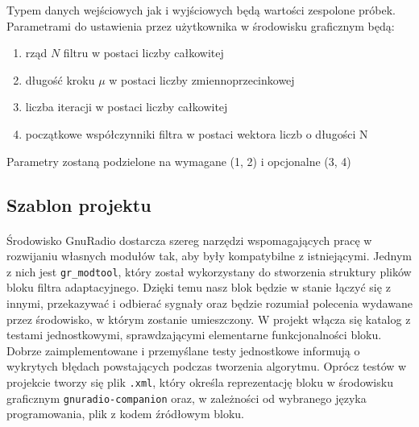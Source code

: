 Typem danych wejściowych jak i wyjściowych będą wartości zespolone próbek.
Parametrami do ustawienia przez użytkownika w środowisku graficznym będą:
\begin{enumerate}
 \item rząd $N$ filtru w postaci liczby całkowitej 
 \item długość kroku $\mu$ w postaci liczby zmiennoprzecinkowej
 \item liczba iteracji w postaci liczby całkowitej
 \item początkowe współczynniki filtra w postaci wektora liczb o długości N 
 \end{enumerate}
 
Parametry zostaną podzielone na wymagane (1, 2) i opcjonalne (3, 4)
\subsection{Szablon projektu}
\paragraph{}
Środowisko GnuRadio dostarcza szereg narzędzi wspomagających pracę w rozwijaniu własnych modułów tak, aby były kompatybilne z istniejącymi. 
Jednym z nich jest \texttt{gr\_modtool}, który został wykorzystany do stworzenia struktury plików bloku filtra adaptacyjnego. 
Dzięki temu nasz blok będzie w stanie łączyć się z innymi, przekazywać i odbierać sygnały oraz będzie rozumiał polecenia wydawane przez środowisko, w którym zostanie umieszczony. 
W projekt włącza się katalog z testami jednostkowymi, sprawdzającymi elementarne funkcjonalności bloku. 
Dobrze zaimplementowane i przemyślane testy jednostkowe informują o wykrytych błędach powstających podczas tworzenia algorytmu.
Oprócz testów w projekcie tworzy się plik \texttt{.xml}, który określa reprezentację bloku w środowisku graficznym \texttt{gnuradio-companion} oraz, w zależności od wybranego języka programowania, plik z kodem źródłowym bloku.